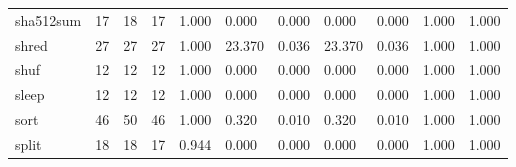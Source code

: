 \begin{longtable}{lp{1.2cm}p{1.2cm}p{1.2cm}p{1.2cm}p{1.2cm}p{1.2cm}p{1.2cm}p{1.2cm}p{1.2cm}p{1.2cm}}
sha512sum &                           17 &                 18 &                                17 &                                      1.000 &                                  0.000 &                                        0.000 &                             0.000 &                                   0.000 &                              1.000 &                                              1.000 \\
shred     &                           27 &                 27 &                                27 &                                      1.000 &                                 23.370 &                                        0.036 &                            23.370 &                                   0.036 &                              1.000 &                                              1.000 \\
shuf      &                           12 &                 12 &                                12 &                                      1.000 &                                  0.000 &                                        0.000 &                             0.000 &                                   0.000 &                              1.000 &                                              1.000 \\
sleep     &                           12 &                 12 &                                12 &                                      1.000 &                                  0.000 &                                        0.000 &                             0.000 &                                   0.000 &                              1.000 &                                              1.000 \\
sort      &                           46 &                 50 &                                46 &                                      1.000 &                                  0.320 &                                        0.010 &                             0.320 &                                   0.010 &                              1.000 &                                              1.000 \\
split     &                           18 &                 18 &                                17 &                                      0.944 &                                  0.000 &                                        0.000 &                             0.000 &                                   0.000 &                              1.000 &                                              1.000 \\

\end{longtable}
